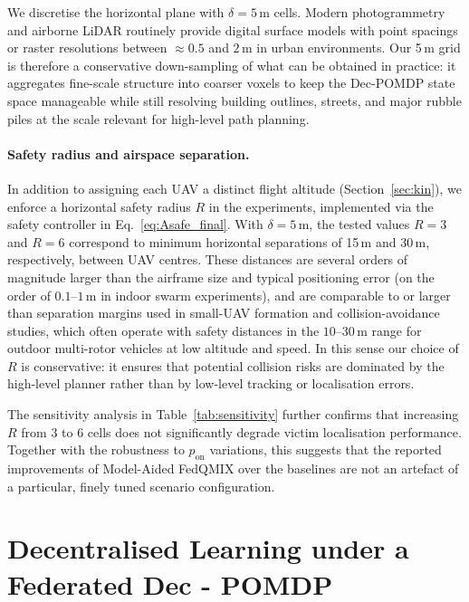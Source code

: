 \documentclass[drones,article,accept,pdftex,moreauthors]{Definitions/mdpi}
\begin{document}
We discretise the horizontal plane with $\delta = 5$\,m cells. Modern
photogrammetry and airborne LiDAR routinely provide digital surface
models with point spacings or raster resolutions between $\approx 0.5$ and
$2$\,m in urban environments. Our
5\,m grid is therefore a conservative down-sampling of what can be
obtained in practice: it aggregates fine-scale structure into coarser
voxels to keep the Dec-POMDP state space manageable while still
resolving building outlines, streets, and major rubble piles at the
scale relevant for high-level path planning.

\paragraph{Safety radius and airspace separation.}
In addition to assigning each UAV a distinct flight altitude
(Section~\ref{sec:kin}), we enforce a horizontal safety radius $R$ in the
experiments, implemented via the safety controller in
Eq.~\eqref{eq:Asafe_final}. With $\delta = 5$\,m, the tested values
$R=3$ and $R=6$ correspond to minimum horizontal separations of
15\,m and 30\,m, respectively, between UAV centres. These distances are
several orders of magnitude larger than the airframe size and typical
positioning error (on the order of $0.1$–$1$\,m in indoor swarm
experiments), and are comparable to or larger than
separation margins used in small-UAV formation and collision-avoidance
studies, which often operate with safety distances in the
$10$–$30$\,m range for outdoor multi-rotor vehicles at low altitude
and speed. In this sense our choice of $R$ is conservative:
it ensures that potential collision risks are dominated by the high-level
planner rather than by low-level tracking or localisation errors.

The sensitivity analysis in Table~\ref{tab:sensitivity} further confirms
that increasing $R$ from 3 to 6 cells does not significantly degrade
victim localisation performance. Together with the robustness to
$p_{\mathrm{on}}$ variations, this suggests that the reported improvements
of Model-Aided FedQMIX over the baselines are not an artefact of a
particular, finely tuned scenario configuration.

\section{Decentralised Learning under a Federated Dec \textnormal{-} POMDP}
\label{sec:DecPOMDP}
\end{document}
